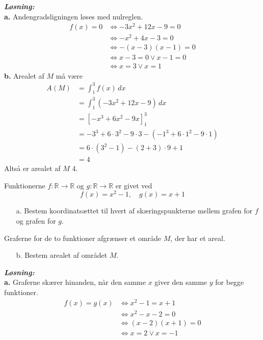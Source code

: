 \documentclass{article}
\newcommand{\sol}{\setlength{\parindent}{0cm}\textbf{\textit{Løsning:}}\setlength{\parindent}{1cm}}
\begin{document}
\sol \\
\textbf{a.}
Andengradsligningen løses med nulreglen.
\begin{equation*}
\begin{split}
  f(x)=0 &\iff -3x^2+12x-9=0\\ 
  &\iff -x^2 + 4x - 3=0\\ 
  &\iff -(x-3)(x-1)=0\\ 
  &\iff x-3=0 \lor x-1=0\\ 
  &\iff x=3 \lor x=1
\end{split}
\end{equation*}
\textbf{b.}
Arealet af $M$ må være 
\begin{equation*}
\begin{split}
  A(M)&=\int_{1}^{3} f(x) \,dx \\ 
  &=\int_{1}^{3} (-3x^2+12x-9) \,dx \\ 
  &=\left[-x^3+6x^2-9x\right]_1^3\\ 
  &=-3^3+6 \cdot 3^2 - 9 \cdot 3 -(-1^3+6 \cdot 1^2 - 9 \cdot 1)\\ 
  &=6 \cdot (3^2-1) - (2+3) \cdot 9 + 1\\ 
  &=4
\end{split}
\end{equation*}
Altså er arealet af $M$ 4. 
\begin{question}{}{}
  Funktionerne $f:\mathbb{R}\to \mathbb{R}$ og $g:\mathbb{R}\to \mathbb{R}$ er givet ved
  \[
  f(x)= x^2-1, \quad g(x)=x+1
  \] 
  \begin{itemize}
    \item[a.] Bestem koordinatsættet til hvert af skæringspunkterne mellem grafen for $f$ og grafen for $g$. 
  \end{itemize}
  Graferne for de to funktioner afgrænser et område $M$, der har et areal.
  \begin{itemize}
    \item[b.] Bestem arealet af området $M$.
  \end{itemize}
\end{question}
\sol \\
\textbf{a.}
Graferne skærer hinanden, når den samme $x$ giver den samme $y$ for begge funktioner. 
\begin{equation*}
\begin{split}
  f(x)=g(x) &\iff x^2-1=x+1\\ 
  &\iff x^2-x-2=0\\ 
  &\iff (x-2)(x+1)=0\\ 
  &\iff x=2 \lor x=-1
\end{split}
\end{equation*}
\end{document}
